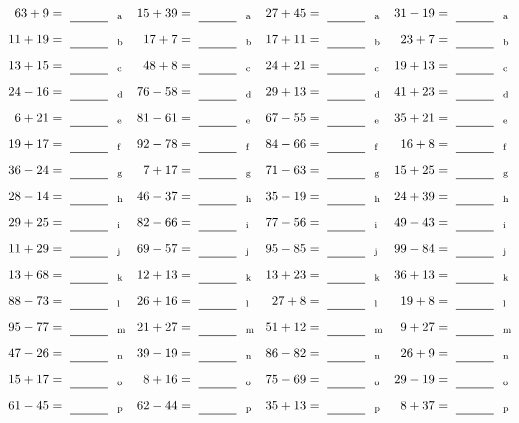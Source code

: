\documentclass
[
  draft    = true,
  fontsize = 11pt,
  parskip  = half-
]
{scrartcl}
\begin{document}
\clearpage
\begin{align*}
    \pline{63+9}&=\rline{a}
  & \pline{15+39}&=\rline{a}
  & \pline{27+45}&=\rline{a}
  & \pline{31-19}&=\rline{a} \\[1ex]
    \pline{11+19}&=\rline{b}
  & \pline{17+7}&=\rline{b}
  & \pline{17+11}&=\rline{b}
  & \pline{23+7}&=\rline{b} \\[1ex]
    \pline{13+15}&=\rline{c}
  & \pline{48+8}&=\rline{c}
  & \pline{24+21}&=\rline{c}
  & \pline{19+13}&=\rline{c} \\[1ex]
    \pline{24-16}&=\rline{d}
  & \pline{76-58}&=\rline{d}
  & \pline{29+13}&=\rline{d}
  & \pline{41+23}&=\rline{d} \\[1ex]
    \pline{6+21}&=\rline{e}
  & \pline{81-61}&=\rline{e}
  & \pline{67-55}&=\rline{e}
  & \pline{35+21}&=\rline{e} \\[1ex]
    \pline{19+17}&=\rline{f}
  & \pline{92-78}&=\rline{f}
  & \pline{84-66}&=\rline{f}
  & \pline{16+8}&=\rline{f} \\[1ex]
    \pline{36-24}&=\rline{g}
  & \pline{7+17}&=\rline{g}
  & \pline{71-63}&=\rline{g}
  & \pline{15+25}&=\rline{g} \\[1ex]
    \pline{28-14}&=\rline{h}
  & \pline{46-37}&=\rline{h}
  & \pline{35-19}&=\rline{h}
  & \pline{24+39}&=\rline{h} \\[1ex]
    \pline{29+25}&=\rline{i}
  & \pline{82-66}&=\rline{i}
  & \pline{77-56}&=\rline{i}
  & \pline{49-43}&=\rline{i} \\[1ex]
    \pline{11+29}&=\rline{j}
  & \pline{69-57}&=\rline{j}
  & \pline{95-85}&=\rline{j}
  & \pline{99-84}&=\rline{j} \\[1ex]
    \pline{13+68}&=\rline{k}
  & \pline{12+13}&=\rline{k}
  & \pline{13+23}&=\rline{k}
  & \pline{36+13}&=\rline{k} \\[1ex]
    \pline{88-73}&=\rline{l}
  & \pline{26+16}&=\rline{l}
  & \pline{27+8}&=\rline{l}
  & \pline{19+8}&=\rline{l} \\[1ex]
    \pline{95-77}&=\rline{m}
  & \pline{21+27}&=\rline{m}
  & \pline{51+12}&=\rline{m}
  & \pline{9+27}&=\rline{m} \\[1ex]
    \pline{47-26}&=\rline{n}
  & \pline{39-19}&=\rline{n}
  & \pline{86-82}&=\rline{n}
  & \pline{26+9}&=\rline{n} \\[1ex]
    \pline{15+17}&=\rline{o}
  & \pline{8+16}&=\rline{o}
  & \pline{75-69}&=\rline{o}
  & \pline{29-19}&=\rline{o} \\[1ex]
    \pline{61-45}&=\rline{p}
  & \pline{62-44}&=\rline{p}
  & \pline{35+13}&=\rline{p}
  & \pline{8+37}&=\rline{p}
\end{align*}
\end{document}
